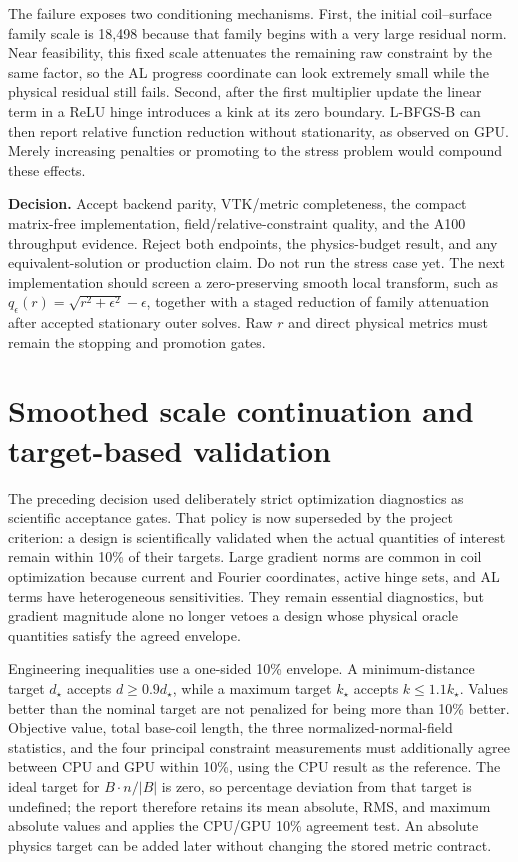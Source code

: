 \documentclass[11pt,a4paper]{article}
\begin{document}
The failure exposes two conditioning mechanisms.  First, the initial
coil--surface family scale is 18,498 because that family begins with a very
large residual norm.  Near feasibility, this fixed scale attenuates the
remaining raw constraint by the same factor, so the AL progress coordinate can
look extremely small while the physical residual still fails.  Second, after
the first multiplier update the linear term in a ReLU hinge introduces a kink
at its zero boundary.  L-BFGS-B can then report relative function reduction
without stationarity, as observed on GPU.  Merely increasing penalties or
promoting to the stress problem would compound these effects.

\textbf{Decision.}  Accept backend parity, VTK/metric completeness, the compact
matrix-free implementation, field/relative-constraint quality, and the A100
throughput evidence.  Reject both endpoints, the physics-budget result, and any
equivalent-solution or production claim.  Do not run the stress case yet.  The
next implementation should screen a zero-preserving smooth local transform,
such as $q_\epsilon(r)=\sqrt{r^2+\epsilon^2}-\epsilon$, together with a staged
reduction of family attenuation after accepted stationary outer solves.  Raw
$r$ and direct physical metrics must remain the stopping and promotion gates.

\section{Smoothed scale continuation and target-based validation}

The preceding decision used deliberately strict optimization diagnostics as
scientific acceptance gates.  That policy is now superseded by the project
criterion: a design is scientifically validated when the actual quantities of
interest remain within 10\% of their targets.  Large gradient norms are common
in coil optimization because current and Fourier coordinates, active hinge
sets, and AL terms have heterogeneous sensitivities.  They remain essential
diagnostics, but gradient magnitude alone no longer vetoes a design whose
physical oracle quantities satisfy the agreed envelope.

Engineering inequalities use a one-sided 10\% envelope.  A minimum-distance
target $d_\star$ accepts $d\geq0.9d_\star$, while a maximum target
$k_\star$ accepts $k\leq1.1k_\star$.  Values better than the nominal target are
not penalized for being more than 10\% better.  Objective value, total base-coil
length, the three normalized-normal-field statistics, and the four principal
constraint measurements must additionally agree between CPU and GPU within
10\%, using the CPU result as the reference.  The ideal target for
$B\cdot n/|B|$ is zero, so percentage deviation from that target is undefined;
the report therefore retains its mean absolute, RMS, and maximum absolute
values and applies the CPU/GPU 10\% agreement test.  An absolute physics target
can be added later without changing the stored metric contract.
\end{document}
